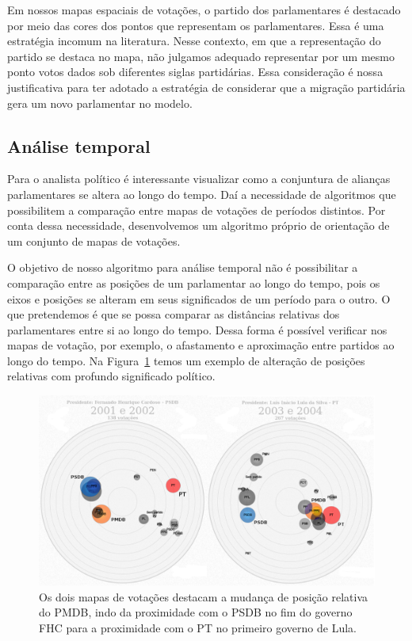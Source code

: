 \documentclass[a4paper, 12pt]{article}
\begin{document}
Em nossos mapas espaciais de votações, o partido dos parlamentares é destacado por meio das cores dos pontos que representam os parlamentares. Essa é uma estratégia incomum na literatura. Nesse contexto, em que a representação do partido se destaca no mapa, não julgamos adequado representar por um mesmo ponto votos dados sob diferentes siglas partidárias. Essa consideração é nossa justificativa para ter adotado a estratégia de considerar que a migração partidária gera um novo parlamentar no modelo.

\subsection{Análise temporal}

Para o analista político é interessante visualizar como a conjuntura de alianças parlamentares se altera ao longo do tempo. Daí a necessidade de algoritmos que possibilitem a comparação entre mapas de votações de períodos distintos. Por conta dessa necessidade, desenvolvemos um algoritmo próprio de orientação de um conjunto de mapas de votações.

O objetivo de nosso algoritmo para análise temporal não é possibilitar a comparação entre as posições de um parlamentar ao longo do tempo, pois os eixos e posições se alteram em seus significados de um período para o outro. O que pretendemos é que se possa comparar as distâncias relativas dos parlamentares entre si ao longo do tempo. Dessa forma é possível verificar nos mapas de votação, por exemplo, o afastamento e aproximação entre partidos ao longo do tempo. Na Figura~\ref{fig:fhc2-lula1} temos um exemplo de alteração de posições relativas com profundo significado político. \\

\begin{figure}[h]
  \centering
  \includegraphics[scale=0.37]{figs/fhc2-lula1.png}
  \caption{Os dois mapas de votações destacam a mudança de posição relativa do PMDB, indo da proximidade com o PSDB no fim do governo FHC para a proximidade com o PT no primeiro governo de Lula.}
  \label{fig:fhc2-lula1}
\end{figure}
\end{document}

